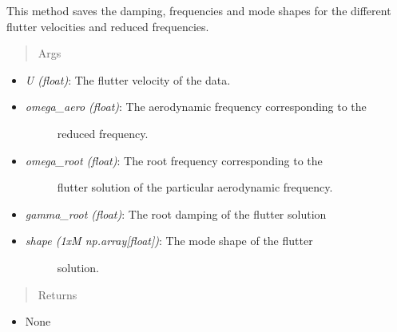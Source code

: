 \documentclass[letterpaper,10pt,english]{sphinxmanual}
\begin{document}
\begin{fulllineitems}
\begin{fulllineitems}
This method saves the damping, frequencies and mode shapes for the
different flutter velocities and reduced frequencies.
\begin{quote}\begin{description}
\item[{Args}] \leavevmode
\end{description}\end{quote}
\begin{itemize}
\item {} 
\emph{U (float)}: The flutter velocity of the data.

\item {} \begin{description}
\item[{\emph{omega\_aero (float)}: The aerodynamic frequency corresponding to the}] \leavevmode
reduced frequency.

\end{description}

\item {} \begin{description}
\item[{\emph{omega\_root (float)}: The root frequency corresponding to the}] \leavevmode
flutter solution of the particular aerodynamic frequency.

\end{description}

\item {} 
\emph{gamma\_root (float)}: The root damping of the flutter solution

\item {} \begin{description}
\item[{\emph{shape (1xM np.array{[}float{]})}: The mode shape of the flutter}] \leavevmode
solution.

\end{description}

\end{itemize}
\begin{quote}\begin{description}
\item[{Returns}] \leavevmode
\end{description}\end{quote}
\begin{itemize}
\item {} 
None

\end{itemize}

\end{fulllineitems}


\end{fulllineitems}
\end{document}
